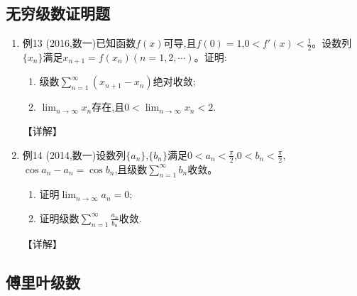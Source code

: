 \documentclass[12pt, a4paper, oneside, UTF8]{ctexbook}
\begin{document}
\subsection{无穷级数证明题}

\begin{enumerate}[label=\arabic*.,start=13]
    \item 例13 (2016,数一)已知函数$f(x)$可导,且$f(0)=1$,$0<f'(x)<\frac{1}{2}$。设数列$\{x_n\}$满足$x_{n+1}=f(x_n)(n=1,2,\cdots)$。证明:
    \begin{enumerate}[label=(\roman*)]
        \item 级数$\sum_{n=1}^{\infty}(x_{n+1}-x_n)$绝对收敛;
        \item $\lim_{n\rightarrow\infty} x_n$存在,且$0<\lim_{n\rightarrow\infty} x_n<2$.
    \end{enumerate}
    
    \begin{solution}
    【详解】
    \end{solution}
    
    \item 例14 (2014,数一)设数列$\{a_n\}$,$\{b_n\}$满足$0<a_n<\frac{\pi}{2}$,$0<b_n<\frac{\pi}{2}$,$\cos a_n-a_n=\cos b_n$,且级数$\sum_{n=1}^{\infty} b_n$收敛。
    \begin{enumerate}[label=(\roman*)]
        \item 证明$\lim_{n\rightarrow\infty} a_n=0$;
        \item 证明级数$\sum_{n=1}^{\infty}\frac{a_n}{b_n}$收敛.
    \end{enumerate}
    
    \begin{solution}
    【详解】
    \end{solution}
\end{enumerate}

\subsection{傅里叶级数}
\end{document}
